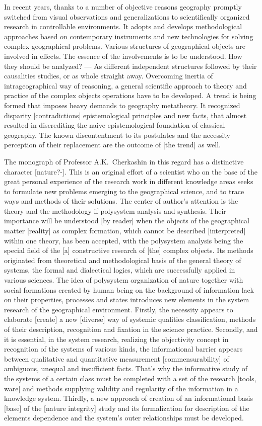 \documentclass[12pt,leqno]{book}
\begin{document}
In recent years, thanks to a number of objective reasons geography promptly switched from visual observations and generalizations to scientifically organized research in controllable environments. It adopts and develops methodological approaches based on contemporary instruments and new technologies for solving complex geographical problems. Various structures of geographical objects are involved in effects. The essence of the involvements is to be understood. How they should be analyzed? --- As different independent structures followed by their causalities studies, or as whole straight away. Overcoming inertia of intrageographical way of reasoning, a general scientific approach to theory and practice of the complex objects operations have to be developed. A trend is being formed that imposes heavy demands to geography metatheory. It recognized disparity [contradictions] epistemological principles and new facts, that almost resulted in discrediting the naive epistemological foundation of classical geography. The known discontentment to its postulates and the necessity perception of their replacement are the outcome of [the trend] as well.

The monograph of Professor A.K.~Cherkashin in this regard has a distinctive character [nature?-]. This is an original effort of a scientist who on the base of the great personal experience of the research work in different knowledge areas seeks to formulate new problems emerging to the geographical science, and to trace ways and methods of their solutions. The center of author's attention is the theory and the methodology if polysystem analysis and synthesis. Their importance will be understood [by reader] when the objects of the geographical matter [reality] as complex formation, which cannot be described [interpreted] within one theory, has been accepted, with the polysystem analysis being the special field of the [a] constructive research of [the] complex objects. Its methods originated from theoretical and methodological basis of the general theory of systems, the formal and dialectical logics, which are successfully applied in various sciences. The idea of polysystem organization of nature together with social formations created by human being on the background of information lack on their properties, processes and states introduces new elements in the system research of the geographical environment. Firstly, the necessity appears to elaborate [create] a new [diverse] way of systemic qualities classification, methods of their description, recognition and fixation in the science practice. Secondly, and it is essential, in the system research, realizing the objectivity concept in recognition of the systems of various kinds, the informational barrier appears between qualitative and quantitative measurement [commensurability] of ambiguous, unequal and insufficient facts. That's why the informative study of the systems of a certain class must be completed with a set of the research [tools, ware] and methods supplying validity and regularity of the information in a knowledge system. Thirdly, a new approach of creation of an informational basis [base] of the [nature integrity] study and its formalization for description of the elements dependence and the system's outer relationships must be developed.
\end{document}
